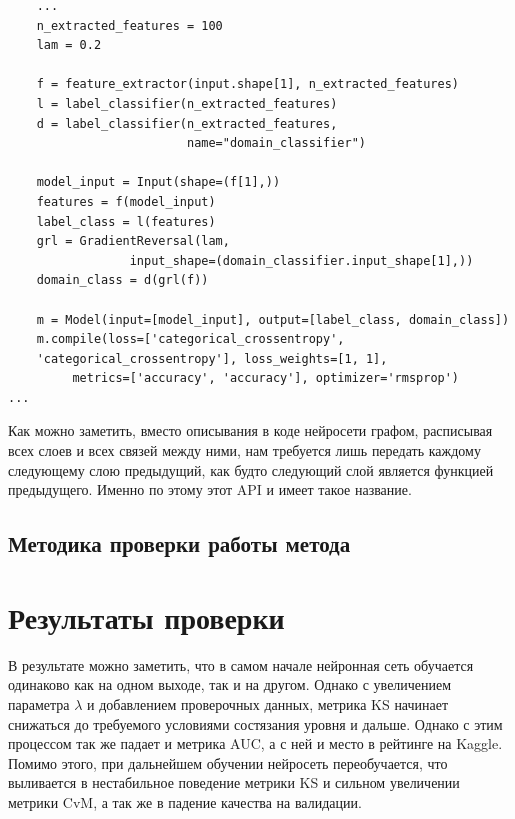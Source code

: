 \documentclass[14pt]{extarticle}
\begin{document}
\begin{verbatim}
	...
	n_extracted_features = 100
	lam = 0.2
	
	f = feature_extractor(input.shape[1], n_extracted_features)
	l = label_classifier(n_extracted_features)
	d = label_classifier(n_extracted_features,
	                     name="domain_classifier")
	                     
	model_input = Input(shape=(f[1],))
	features = f(model_input)
	label_class = l(features)
	grl = GradientReversal(lam, 
                 input_shape=(domain_classifier.input_shape[1],))
	domain_class = d(grl(f))

	m = Model(input=[model_input], output=[label_class, domain_class])
	m.compile(loss=['categorical_crossentropy',
    'categorical_crossentropy'], loss_weights=[1, 1],
         metrics=['accuracy', 'accuracy'], optimizer='rmsprop')
...
\end{verbatim}

Как можно заметить, вместо описывания в коде нейросети графом, расписывая всех слоев и всех связей между ними, нам требуется лишь передать каждому следующему слою предыдущий, как будто следующий слой является функцией предыдущего. Именно по этому этот API и имеет такое название.

\subsection{Методика проверки работы метода}



\newpage
\section{Результаты проверки}

В результате можно заметить, что в самом начале нейронная сеть обучается одинаково как на одном выходе, так и на другом. Однако с увеличением параметра $\lambda$ и добавлением проверочных данных, метрика KS начинает снижаться до требуемого условиями состязания уровня и дальше. Однако с этим процессом так же падает и метрика AUC, а с ней и место в рейтинге на Kaggle. Помимо этого, при дальнейшем обучении нейросеть переобучается, что выливается в нестабильное поведение метрики KS и сильном увеличении метрики CvM, а так же в падение качества на валидации. 
\end{document}
